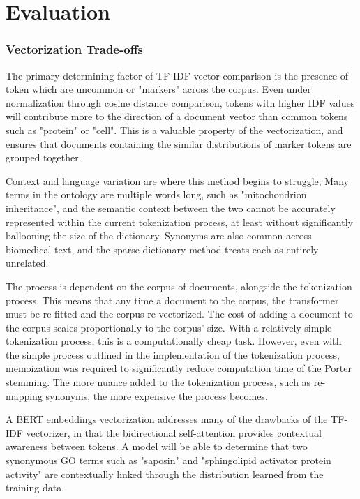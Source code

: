 \documentclass[11pt]{article} %
\theoremstyle{plain}
\theoremstyle{definition}
\begin{document}
\section{Evaluation}

\subsubsection{Vectorization Trade-offs}

The primary determining factor of TF-IDF vector comparison is the presence of token which are uncommon or "markers" across the corpus. Even under normalization through cosine distance comparison, tokens with higher IDF values will contribute more to the direction of a document vector than common tokens such as "protein" or "cell". This is a valuable property of the vectorization, and ensures that documents containing the similar distributions of marker tokens are grouped together.

Context and language variation are where this method begins to struggle; Many terms in the ontology are multiple words long, such as "mitochondrion inheritance", and the semantic context between the two cannot be accurately represented within the current tokenization process, at least without significantly ballooning the size of the dictionary. Synonyms are also common across biomedical text, and the sparse dictionary method treats each as entirely unrelated.

The process is dependent on the corpus of documents, alongside the tokenization process. This means that any time a document to the corpus, the transformer must be re-fitted and the corpus re-vectorized. The cost of adding a document to the corpus scales proportionally to the corpus' size. With a relatively simple tokenization process, this is a computationally cheap task. However, even with the simple process outlined in the implementation of the tokenization process, memoization was required to significantly reduce computation time of the Porter stemming. The more nuance added to the tokenization process, such as re-mapping synonyms, the more expensive the process becomes.

A BERT embeddings vectorization addresses many of the drawbacks of the TF-IDF vectorizer, in that the bidirectional self-attention provides contextual awareness between tokens. A model will be able to determine that two synonymous GO terms such as "saposin" and "sphingolipid activator protein activity" are contextually linked through the distribution learned from the training data.
\end{document}
